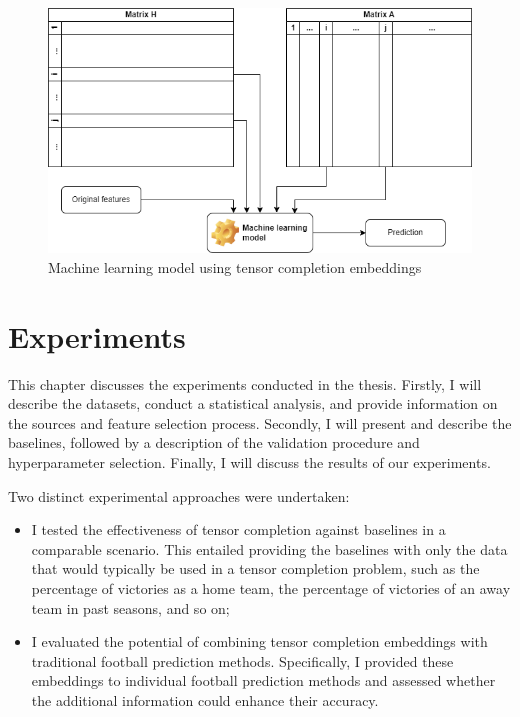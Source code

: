 \documentclass[thesis=M,english]{FITthesis}[2019/12/23]
\begin{document}
\begin{figure}[h]
    \centering
    \includegraphics[width=1\textwidth]{figures/model_vectors.png}
    \caption{Machine learning model using tensor completion embeddings}
    \label{fig:nn_vectors_diagram}
\end{figure}

\chapter{Experiments}
This chapter discusses the experiments conducted in the thesis. Firstly, I will describe the datasets, conduct a statistical analysis, and provide information on the sources and feature selection process. Secondly, I will present and describe the baselines, followed by a description of the validation procedure and hyperparameter selection. Finally, I will discuss the results of our experiments.

Two distinct experimental approaches were undertaken:

\begin{itemize}
    \item I tested the effectiveness of tensor completion against baselines in a comparable scenario. This entailed providing the baselines with only the data that would typically be used in a tensor completion problem, such as the percentage of victories as a home team, the percentage of victories of an away team in past seasons, and so on;
    \item I evaluated the potential of combining tensor completion embeddings with traditional football prediction methods. Specifically, I provided these embeddings to individual football prediction methods and assessed whether the additional information could enhance their accuracy.
\end{itemize}
\end{document}
